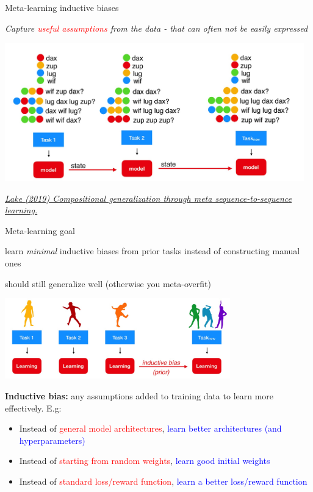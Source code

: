 \begin{frame}{Meta-learning inductive biases}
\centerline{\textit{Capture \textcolor{red}{useful assumptions} from the data - that can often not be easily expressed}}
\centering\includegraphics[height=6cm]{image/img193434.jpg}

\vspace{0.2cm}
\raggedright{\footnotesize{\textit{
\href{https://arxiv.org/abs/1906.05381}{Lake (2019) Compositional generalization through meta sequence-to-sequence learning.}}
}}
\end{frame}

\begin{frame}{Meta-learning goal}
\centerline{learn \textit{minimal} inductive biases from prior tasks instead of constructing manual ones }
\centerline{should still generalize well (otherwise you meta-overfit)}
\centering\includegraphics[height=3.5cm]{image/img193722.jpg}


\textbf{Inductive bias:} any assumptions added to training data to learn more effectively. E.g:
\begin{itemize}
  \item Instead of \textcolor{red}{general model architectures}, \textcolor{blue}{learn better architectures (and hyperparameters)}
  \item Instead of \textcolor{red}{starting from random weights}, \textcolor{blue}{learn good initial weights}
  \item Instead of \textcolor{red}{standard loss/reward function}, \textcolor{blue}{learn a better loss/reward function}
\end{itemize}
\end{frame}

